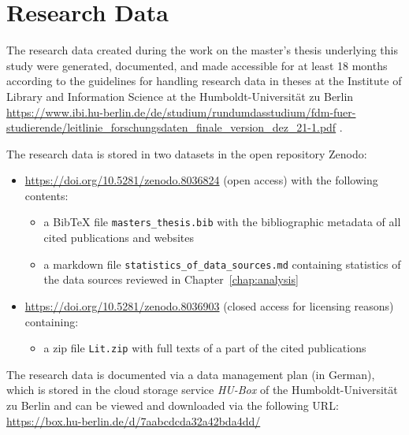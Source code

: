 \chapter{Research Data}
\label{chap:DMP}

The research data created during the work on the master's thesis underlying this study 
were generated, documented, and made accessible for at least 18 months
according to the guidelines for handling research data in theses
at the Institute of Library and Information Science at the 
\foreignlanguage{ngerman}{Humboldt-Universität zu Berlin}
\url{https://www.ibi.hu-berlin.de/de/studium/rundumdasstudium/fdm-fuer-studierende/leitlinie_forschungsdaten_finale_version_dez_21-1.pdf} .

The research data is stored in two datasets in the open repository Zenodo:
%
\begin{itemize}
  \item
    \url{https://doi.org/10.5281/zenodo.8036824} (open access) with the following contents:
    \begin{itemize}
      \item
        a BibTeX file \verb!masters_thesis.bib! with the bibliographic metadata of all cited publications and websites
      \item
        a markdown file \verb!statistics_of_data_sources.md! containing statistics of the data sources reviewed in Chapter~\ref{chap:analysis}
    \end{itemize}
  \item
    \url{https://doi.org/10.5281/zenodo.8036903} (closed access for licensing reasons) containing:
    \begin{itemize}
      \item
        a zip file \verb!Lit.zip! with full texts of a part of the cited publications
    \end{itemize}    
\end{itemize}

The research data is documented via a data management plan (in German),
which is stored in the cloud storage service \emph{HU-Box} of the \foreignlanguage{ngerman}{Humboldt-Universität zu Berlin}
and can be viewed and downloaded via the following URL: \url{https://box.hu-berlin.de/d/7aabcdcda32a42bda4dd/}


%
%



